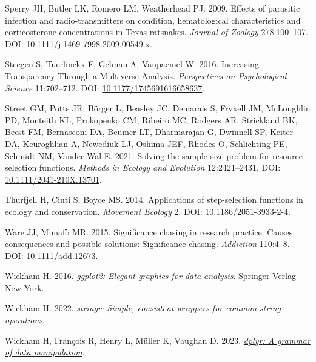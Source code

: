 \documentclass[10pt,a4paper]{article}
\newlength{\cslhangindent}
\newlength{\cslentryspacingunit} %
\newenvironment{CSLReferences}[2] %
 {%
  \setlength{\parindent}{0pt}
  \ifodd #1
  \let\oldpar\par
  \def\par{\hangindent=\cslhangindent\oldpar}
  \fi
  \setlength{\parskip}{#2\cslentryspacingunit}
 }%
 {}
\begin{document}
\begin{CSLReferences}{1}{0}
Sperry JH, Butler LK, Romero LM, Weatherhead PJ. 2009. Effects of parasitic infection and radio-transmitters on condition, hematological characteristics and corticosterone concentrations in {Texas} ratsnakes. \emph{Journal of Zoology} 278:100--107. DOI: \href{https://doi.org/10.1111/j.1469-7998.2009.00549.x}{10.1111/j.1469-7998.2009.00549.x}.

Steegen S, Tuerlinckx F, Gelman A, Vanpaemel W. 2016. Increasing {Transparency} {Through} a {Multiverse} {Analysis}. \emph{Perspectives on Psychological Science} 11:702--712. DOI: \href{https://doi.org/10.1177/1745691616658637}{10.1177/1745691616658637}.

Street GM, Potts JR, Börger L, Beasley JC, Demarais S, Fryxell JM, McLoughlin PD, Monteith KL, Prokopenko CM, Ribeiro MC, Rodgers AR, Strickland BK, Beest FM, Bernasconi DA, Beumer LT, Dharmarajan G, Dwinnell SP, Keiter DA, Keuroghlian A, Newediuk LJ, Oshima JEF, Rhodes O, Schlichting PE, Schmidt NM, Vander Wal E. 2021. Solving the sample size problem for resource selection functions. \emph{Methods in Ecology and Evolution} 12:2421--2431. DOI: \href{https://doi.org/10.1111/2041-210X.13701}{10.1111/2041-210X.13701}.

Thurfjell H, Ciuti S, Boyce MS. 2014. Applications of step-selection functions in ecology and conservation. \emph{Movement Ecology} 2. DOI: \href{https://doi.org/10.1186/2051-3933-2-4}{10.1186/2051-3933-2-4}.

Ware JJ, Munafò MR. 2015. Significance chasing in research practice: Causes, consequences and possible solutions: {Significance} chasing. \emph{Addiction} 110:4--8. DOI: \href{https://doi.org/10.1111/add.12673}{10.1111/add.12673}.

Wickham H. 2016. \emph{\href{https://ggplot2.tidyverse.org}{ggplot2: Elegant graphics for data analysis}}. Springer-Verlag New York.

Wickham H. 2022. \emph{\href{https://CRAN.R-project.org/package=stringr}{{stringr}: Simple, consistent wrappers for common string operations}}.

Wickham H, François R, Henry L, Müller K, Vaughan D. 2023. \emph{\href{https://CRAN.R-project.org/package=dplyr}{{dplyr}: A grammar of data manipulation}}.


\end{CSLReferences}
\end{document}
